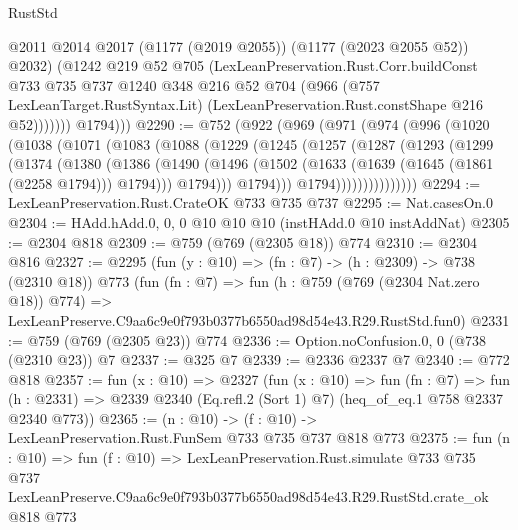 \begin{lexlean}{RustStd}
\begin{coremodule}
                  @2011
                  @2014
                  @2017
                  (@1177 (@2019 @2055))
                  (@1177 (@2023 @2055 @52))
                  @2032)
                (@1242
                  @219
                  @52
                  @705
                  (LexLeanPreservation.Rust.Corr.buildConst
                    @733
                    @735
                    @737
                    @1240
                    @348
                    @216
                    @52
                    @704
                    (@966
                      (@757 LexLeanTarget.RustSyntax.Lit)
                      (LexLeanPreservation.Rust.constShape @216 @52)))))))
          @1794)))
@2290 := @752
    (@922
      (@969
        (@971
          (@974
            (@996
              (@1020
                (@1038
                  (@1071
                    (@1083
                      (@1088
                        (@1229
                          (@1245
                            (@1257
                              (@1287
                                (@1293
                                  (@1299
                                    (@1374
                                      (@1380
                                        (@1386
                                          (@1490
                                            (@1496
                                              (@1502
                                                (@1633 (@1639 (@1645 (@1861 (@2258 @1794))) @1794)))
                                              @1794)))
                                        @1794)))
                                  @1794)))))))))))))))
@2294 := LexLeanPreservation.Rust.CrateOK @733 @735 @737
@2295 := Nat.casesOn.{0}
@2304 := HAdd.hAdd.{0, 0, 0} @10 @10 @10 (instHAdd.{0} @10 instAddNat)
@2305 := @2304 @818
@2309 := @759 (@769 (@2305 @18)) @774
@2310 := @2304 @816
@2327 := @2295
    (fun (y : @10) => (fn : @7) -> (h : @2309) -> @738 (@2310 @18))
    @773
    (fun (fn : @7) =>
    fun (h : @759 (@769 (@2304 Nat.zero @18)) @774) =>
    LexLeanPreserve.C9aa6c9e0f793b0377b6550ad98d54e43.R29.RustStd.fun0)
@2331 := @759 (@769 (@2305 @23)) @774
@2336 := Option.noConfusion.{0, 0} (@738 (@2310 @23)) @7
@2337 := @325 @7
@2339 := @2336 @2337 @7
@2340 := @772 @818
@2357 := fun (x : @10) =>
  @2327
    (fun (x : @10) =>
    fun (fn : @7) =>
    fun (h : @2331) => @2339 @2340 (Eq.refl.{2} (Sort 1) @7) (heq_of_eq.{1} @758 @2337 @2340 @773))
@2365 := (n : @10) -> (f : @10) -> LexLeanPreservation.Rust.FunSem @733 @735 @737 @818 @773
@2375 := fun (n : @10) =>
  fun (f : @10) =>
  LexLeanPreservation.Rust.simulate
    @733
    @735
    @737
    LexLeanPreserve.C9aa6c9e0f793b0377b6550ad98d54e43.R29.RustStd.crate_ok
    @818
    @773
\end{coremodule}
\end{lexlean}
